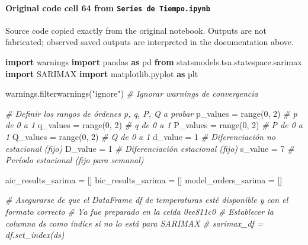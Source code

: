 \documentclass[
  11pt,
]{article}
\newenvironment{Shaded}{}{}
\newcommand{\BuiltInTok}[1]{\textcolor[rgb]{0.00,0.50,0.00}{#1}}
\newcommand{\CommentTok}[1]{\textcolor[rgb]{0.38,0.63,0.69}{\textit{#1}}}
\newcommand{\DecValTok}[1]{\textcolor[rgb]{0.25,0.63,0.44}{#1}}
\newcommand{\ImportTok}[1]{\textcolor[rgb]{0.00,0.50,0.00}{\textbf{#1}}}
\newcommand{\NormalTok}[1]{#1}
\newcommand{\OperatorTok}[1]{\textcolor[rgb]{0.40,0.40,0.40}{#1}}
\newcommand{\StringTok}[1]{\textcolor[rgb]{0.25,0.44,0.63}{#1}}
\begin{document}
\paragraph{\texorpdfstring{Original code cell 64 from \texttt{Series\ de\ Tiempo.ipynb}}{Original code cell 64 from Series de Tiempo.ipynb}}\label{original-code-cell-64-from-series-de-tiempoipynb}

Source code copied exactly from the original notebook. Outputs are not fabricated; observed saved outputs are interpreted in the documentation above.

\begin{Shaded}
\begin{Highlighting}[]
\ImportTok{import}\NormalTok{ warnings}
\ImportTok{import}\NormalTok{ pandas }\ImportTok{as}\NormalTok{ pd}
\ImportTok{from}\NormalTok{ statsmodels.tsa.statespace.sarimax }\ImportTok{import}\NormalTok{ SARIMAX}
\ImportTok{import}\NormalTok{ matplotlib.pyplot }\ImportTok{as}\NormalTok{ plt}

\NormalTok{warnings.filterwarnings(}\StringTok{"ignore"}\NormalTok{) }\CommentTok{\# Ignorar warnings de convergencia}

\CommentTok{\# Definir los rangos de órdenes p, q, P, Q a probar}
\NormalTok{p\_values }\OperatorTok{=} \BuiltInTok{range}\NormalTok{(}\DecValTok{0}\NormalTok{, }\DecValTok{2}\NormalTok{)  }\CommentTok{\# p de 0 a 1}
\NormalTok{q\_values }\OperatorTok{=} \BuiltInTok{range}\NormalTok{(}\DecValTok{0}\NormalTok{, }\DecValTok{2}\NormalTok{)  }\CommentTok{\# q de 0 a 1}
\NormalTok{P\_values }\OperatorTok{=} \BuiltInTok{range}\NormalTok{(}\DecValTok{0}\NormalTok{, }\DecValTok{2}\NormalTok{)  }\CommentTok{\# P de 0 a 1}
\NormalTok{Q\_values }\OperatorTok{=} \BuiltInTok{range}\NormalTok{(}\DecValTok{0}\NormalTok{, }\DecValTok{2}\NormalTok{)  }\CommentTok{\# Q de 0 a 1}
\NormalTok{d\_value }\OperatorTok{=} \DecValTok{1}             \CommentTok{\# Diferenciación no estacional (fijo)}
\NormalTok{D\_value }\OperatorTok{=} \DecValTok{1}             \CommentTok{\# Diferenciación estacional (fijo)}
\NormalTok{s\_value }\OperatorTok{=} \DecValTok{7}             \CommentTok{\# Período estacional (fijo para semanal)}

\NormalTok{aic\_results\_sarima }\OperatorTok{=}\NormalTok{ []}
\NormalTok{bic\_results\_sarima }\OperatorTok{=}\NormalTok{ []}
\NormalTok{model\_orders\_sarima }\OperatorTok{=}\NormalTok{ []}

\CommentTok{\# Asegurarse de que el DataFrame \textquotesingle{}df\textquotesingle{} de temperaturas esté disponible y con el formato correcto}
\CommentTok{\# Ya fue preparado en la celda 0ee811c0}
\CommentTok{\# Establecer la columna \textquotesingle{}ds\textquotesingle{} como índice si no lo está para SARIMAX}
\CommentTok{\# sarimax\_df = df.set\_index(\textquotesingle{}ds\textquotesingle{})}


\end{Highlighting}
\end{Shaded}
\end{document}
